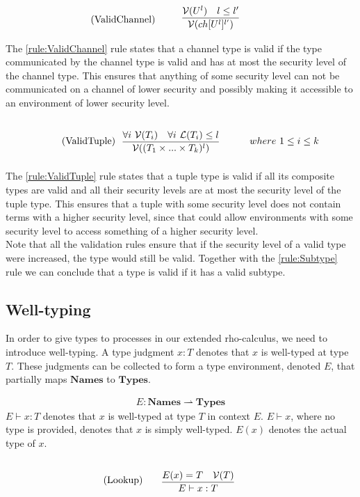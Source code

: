 \begin{align*}
    \tag{ValidChannel}\label{rule:ValidChannel} &\infrule{\valid{U^l}\quad l\leq l'}{\valid{ch[U^l]^{l'}}}
\end{align*}
The \ref{rule:ValidChannel} rule states that a channel type is valid if the type communicated by the channel type is valid and has at most the security level of the channel type.
This ensures that anything of some security level can not be communicated on a channel of lower security and possibly making it accessible to an environment of lower security level.

\begin{align*}
    \tag{ValidTuple}\label{rule:ValidTuple} &\infrule{\forall i\ \valid{T_i}\quad \forall i\ \level{T_i}\leq l}{\valid{(T_1 \times...\times T_k)^l}}& where\ 1\leq i\leq k
\end{align*}
The \ref{rule:ValidTuple} rule states that a tuple type is valid if all its composite types are valid and all their security levels are at most the security level of the tuple type.
This ensures that a tuple with some security level does not contain terms with a higher security level, since that could allow environments with some security level to access something of a higher security level.\\

Note that all the validation rules ensure that if the security level of a valid type were increased, the type would still be valid. Together with the \ref{rule:Subtype} rule we can conclude that a type is valid if it has a valid subtype.

\subsection{Well-typing}
In order to give types to processes in our extended rho-calculus, we need to introduce well-typing.
A type judgment $x:T$ denotes that $x$ is well-typed at type $T$.
These judgments can be collected to form a type environment, denoted $E$, that partially maps $\mathbf{Names}$ to $\mathbf{Types}$.

\begin{align*}
    E: \mathbf{Names} \rightharpoonup \mathbf{Types}
\end{align*}
$E\vdash x:T$ denotes that $x$ is well-typed at type $T$ in context $E$.
$E\vdash x$, where no type is provided, denotes that $x$ is simply well-typed.
$E(x)$ denotes the actual type of $x$.

\begin{align*}
    \tag{Lookup}\label{rule:lookup} &\infrule{E(x)=T\quad\valid{T}}{E\vdash x:T}
\end{align*}

